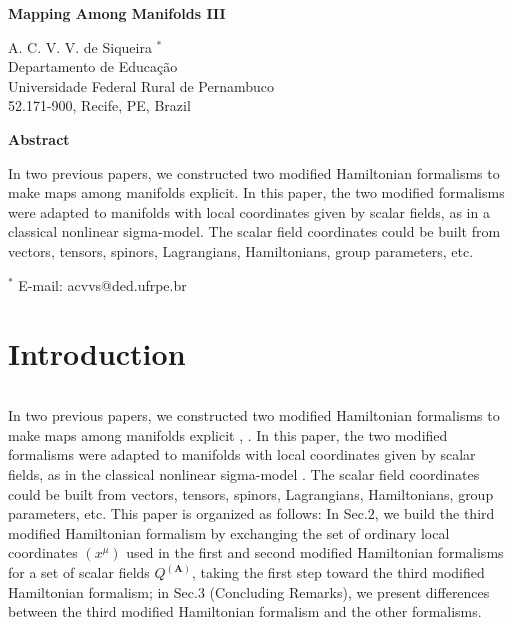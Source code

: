 
\begin{center}{\large{\bf Mapping Among Manifolds III}}
\end{center}
\vspace*{1.5cm}
\begin{center}
A. C. V. V. de Siqueira
$^{*}$ \\
Departamento de Educa\c{c}\~ao\\
Universidade Federal Rural de Pernambuco \\
52.171-900, Recife, PE, Brazil\\
\end{center}
\vspace*{1.5cm}
\begin{center}{\bf Abstract}

In two previous papers, we constructed two modified Hamiltonian formalisms
to make maps among manifolds explicit. In this paper, the two
modified formalisms were adapted to manifolds with local coordinates given by
scalar fields, as in a classical nonlinear sigma-model. The scalar field
coordinates could be built from vectors, tensors, spinors, Lagrangians, Hamiltonians, group parameters, etc.
\end{center}

 \vspace{3cm}


${}^*$ E-mail: acvvs@ded.ufrpe.br
\newline


\newpage

\section{Introduction}
$         $

In two previous papers, we constructed two modified Hamiltonian formalisms
to make maps among manifolds explicit \cite{1}, \cite{2}.
In this paper, the two modified formalisms were adapted to manifolds with local coordinates given by
scalar fields, as in the classical nonlinear sigma-model \cite{3}. The scalar
field coordinates could be built from vectors, tensors, spinors, Lagrangians, Hamiltonians, group parameters, etc.
This paper is organized as follows: In Sec.$2$, we build the third modified Hamiltonian formalism by exchanging the
set of ordinary local coordinates $ (x^{\mu})$ used in the first and second
modified Hamiltonian formalisms for a set of scalar fields $Q^{(\mathbf{A})}$, taking
the first step toward the third modified Hamiltonian formalism; in Sec.$3$ (Concluding Remarks),
we present differences between the third modified Hamiltonian formalism and the other formalisms.
\newpage
\renewcommand{\theequation}{\thesection.\arabic{equation}}

